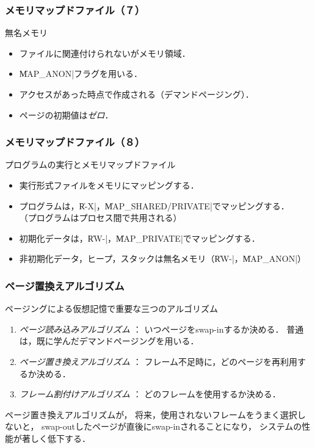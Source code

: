 \documentclass[unicode,handout]{beamer}                   %
\begin{document}
\begin{frame}[fragile]
  \frametitle{メモリマップドファイル（７）}
  無名メモリ
  \vspace{3mm}
  \begin{itemize}
  \item ファイルに関連付けられないがメモリ領域．
  \item \|MAP_ANON|フラグを用いる．
  \item アクセスがあった時点で作成される（デマンドページング）．
  \item ページの初期値は\emph{ゼロ}．
  \end{itemize}
\end{frame}

\begin{frame}[fragile]
  \frametitle{メモリマップドファイル（８）}
  プログラムの実行とメモリマップドファイル
  \begin{itemize}
  \item 実行形式ファイルをメモリにマッピングする．
  \item プログラムは，\|R-X|，\|MAP_SHARED/PRIVATE|でマッピングする．\\
    （プログラムはプロセス間で共用される）
  \item 初期化データは，\|RW-|，\|MAP_PRIVATE|でマッピングする．
  \item 非初期化データ，ヒープ，スタックは無名メモリ（\|RW-|，\|MAP_ANON|）
  \end{itemize}
\end{frame}

\begin{frame}[fragile]
  \frametitle{ページ置換えアルゴリズム}
  ページングによる仮想記憶で重要な三つのアルゴリズム
  \begin{enumerate}
  \item[1.]\emph{ページ読み込みアルゴリズム} ：
    いつページをswap-inするか決める．
    普通は，既に学んだデマンドページングを用いる．
  \item[2.] \emph{ページ置き換えアルゴリズム} ：
    フレーム不足時に，どのページを再利用するか決める．
  \item[3.] \emph{フレーム割付けアルゴリズム} ：
    どのフレームを使用するか決める．
  \end{enumerate}
  \vfill
  ページ置き換えアルゴリズムが，
  将来，使用されないフレームをうまく選択しないと，
  swap-outしたページが直後にswap-inされることになり，
  システムの性能が著しく低下する．
\end{frame}
\end{document}
